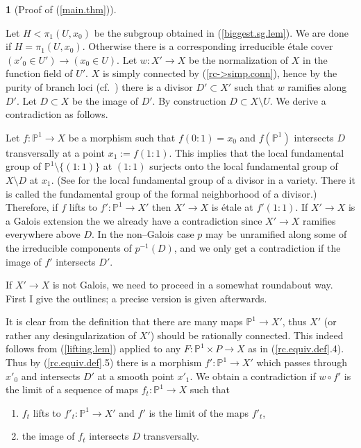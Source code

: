\documentclass[12pt,twoside]{amsart}
\newcommand{\p}[0]{{\mathbb P}}
\theoremstyle{definition}
\newtheorem{say}[thm]{}
\theoremstyle{remark}
\begin{document}
\begin{say}[Proof of (\ref{main.thm})]\label{pf.main.thm} {\ }

Let $H<\pi_1(U,x_0)$ be the subgroup obtained in
(\ref{biggest.sg.lem}). We are done if $H=\pi_1(U,x_0)$.
Otherwise there is a corresponding irreducible \'etale cover
$(x'_0\in U')\to (x_0\in U)$. Let $w:X'\to X$ be the normalization
of $X$ in the function field of $U'$.
$X$   is simply connected by (\ref{rc->simp.conn}),
 hence by the purity of branch loci
(cf.\ \cite[X.3.1]{sga1})
there is a divisor $D'\subset X'$ such that $w$ ramifies along $D'$.
Let $D\subset X$ be the image of $D'$. 
By construction $D\subset X\setminus U$.
We derive a contradiction as follows.

Let $f:\p^1\to X$ be a morphism such that
$f(0{\colon\!} 1)=x_0$ and $f(\p^1)$ intersects
$D$ transversally at a point $x_1:=f(1{\colon\!} 1)$.
This implies that the local fundamental group of
 $\p^1\setminus\{(1{\colon\!} 1)\}$
at $(1{\colon\!} 1)$ 
surjects onto 
the local fundamental group of $X\setminus D$ at $x_1$.
(See \cite{g-murre} for the  local fundamental group 
of a divisor in a  variety. There it is called 
 the fundamental group
of the formal neighborhood of a divisor.)
Therefore, if 
 $f$ lifts to $f':\p^1\to X'$ then
 $X'\to X$ is \'etale at $f'(1{\colon\!} 1)$.
If $X'\to X$ is a Galois extension the we already have a contradiction
since $X'\to X$ ramifies everywhere above $D$.
In the non--Galois case 
$p$ may be unramified along some of the irreducible components of
$p^{-1}(D)$, and we only get a contradiction if the
image of 
 $f'$  intersects  $D'$.

If $X'\to X$ is not Galois, we need to proceed in a
somewhat roundabout way. First I give the outlines; a 
precise version is given 
afterwards.

It is clear from the definition that there are many
maps $\p^1\to X'$, thus $X'$ 
(or rather any desingularization of $X'$) 
 should be rationally connected.
 This indeed follows from  (\ref{lifting.lem})
applied to any $F:\p^1\times P\to X$  as in 
 (\ref{rc.equiv.def}.4).  Thus by
 (\ref{rc.equiv.def}.5) there is a morphism $f':\p^1\to X'$
 which passes through $x'_0$ and intersects $D'$
at a smooth point $x'_1$.
 We obtain a contradiction if $w\circ f'$ is the limit of a sequence of maps
  $f_t:\p^1\to X$ such that
  \begin{enumerate}
  \item $f_t$ lifts to $f'_t:\p^1\to X'$ and $f'$ is
 the limit of the maps $f'_t$,
  \item the image of $f_t$ intersects $D$ transversally.
  \end{enumerate}





\end{say}
\end{document}
